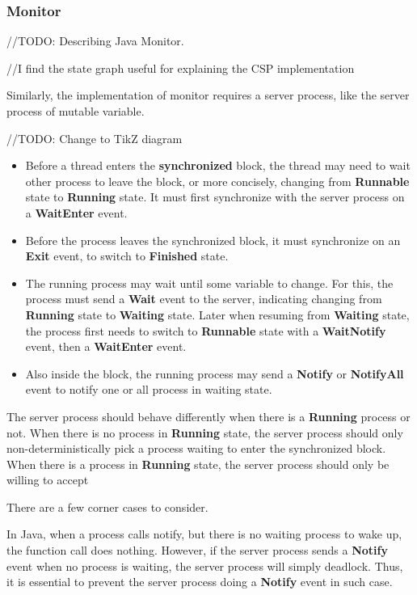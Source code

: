 \subsubsection{Monitor}
//TODO: Describing Java Monitor.

//I find the state graph useful for explaining the CSP implementation

Similarly, the implementation of monitor requires a server process, like the server process of mutable variable.

//TODO: Change to TikZ diagram
\begin{itemize}
    \item Before a thread enters the \textbf{synchronized} block, the thread may need to wait other process to leave the block, or more concisely, changing from \textbf{Runnable} state to \textbf{Running} state. It must first synchronize with the server process on a \textbf{WaitEnter} event.
    \item Before the process leaves the synchronized block, it must synchronize on an \textbf{Exit} event, to switch to \textbf{Finished} state.
    \item The running process may wait until some variable to change. For this, the process must send a \textbf{Wait} event to the server, indicating changing from \textbf{Running} state to \textbf{Waiting} state. Later when resuming from \textbf{Waiting} state, the process first needs to switch to \textbf{Runnable} state with a \textbf{WaitNotify} event, then a \textbf{WaitEnter} event.
    \item Also inside the block, the running process may send a \textbf{Notify} or \textbf{NotifyAll} event to notify one or all process in waiting state.
\end{itemize}

The server process should behave differently when there is a \textbf{Running} process or not. When there is no process in \textbf{Running} state, the server process should only non-deterministically pick a process waiting to enter the synchronized block. When there is a process in \textbf{Running} state, the server process should only be willing to accept 

There are a few corner cases to consider.

In Java, when a process calls notify, but there is no waiting process to wake up, the function call does nothing. However, if the server process sends a \textbf{Notify} event when no process is waiting, the server process will simply deadlock. Thus, it is essential to prevent the server process doing a \textbf{Notify} event in such case.

